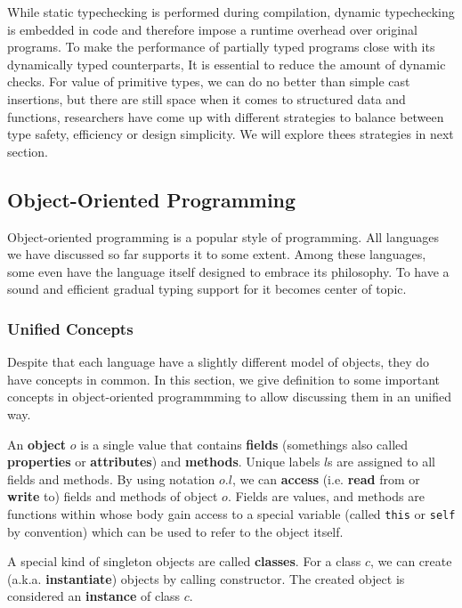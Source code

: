 While static typechecking is performed during compilation,
dynamic typechecking is embedded in code and therefore impose a runtime overhead over original programs.
To make the performance of partially typed programs close with its dynamically typed counterparts,
It is essential to reduce the amount of dynamic checks.
For value of primitive types, we can do no better than simple cast insertions,
but there are still space when it comes to structured data and functions,
researchers have come up with different strategies to balance between type safety, efficiency or design simplicity. We will explore thees strategies in next section.

\subsection{Object-Oriented Programming}

Object-oriented programming is a popular style of programming.
All languages we have discussed so far supports it to some extent.
Among these languages,
some even have the language itself designed to embrace its philosophy.
To have a sound and efficient gradual typing support for it
becomes center of topic.

\subsubsection{Unified Concepts}

Despite that each language have a slightly different model of objects, they do have concepts
in common.
In this section, we give definition to some important concepts in object-oriented programmming
to allow discussing them in an unified way.

An \textbf{object} $o$ is a single value that contains \textbf{fields} (somethings also called
\textbf{properties} or \textbf{attributes}) and \textbf{methods}.
Unique labels $l$s are assigned to all fields and methods. By using notation $o.l$, we can \textbf{access}
(i.e. \textbf{read} from or \textbf{write} to) fields and methods of object $o$.
Fields are values, and methods are functions within whose body gain access to a special variable
(called \texttt{this} or \texttt{self} by convention) which can be used to refer to the object itself.

A special kind of singleton objects are called \textbf{classes}.
For a class $c$, we can create (a.k.a. \textbf{instantiate}) objects by calling constructor.
The created object is considered an \textbf{instance} of class $c$.


